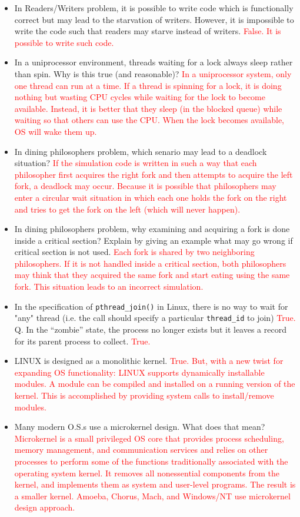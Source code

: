 \documentclass[10pt,landscape]{article}
\newcommand{\answer}[1]{\textcolor{red}{#1}}
\begin{document}
\begin{multicols}{4}
\begin{itemize}
    \item In Readers/Writers problem, it is possible to write code which is functionally correct but may lead to the starvation of writers. However, it is impossible to write the code such that readers may starve instead of writers. \answer{False. It is possible to write such code.}
    \item In a uniprocessor environment, threads waiting for a lock always sleep rather than spin. Why is this true (and reasonable)? \answer{In a uniprocessor system, only one thread can run at a time. If a thread is spinning for a lock, it is doing nothing but wasting CPU cycles while waiting for the lock to become available. Instead, it is better that they sleep (in the blocked queue) while waiting so that others can use the CPU.  When the lock becomes available, OS will wake them up.}
    \item In dining philosophers problem, which senario may lead to a deadlock situation?  \answer{If the simulation code is written in such a way that each philosopher first acquires the right fork and then attempts to acquire the left fork, a deadlock may occur. Because it is possible that philosophers may enter a circular wait situation in which each one holds the fork on the right and tries to get the fork on the left (which will never happen).}
    \item In dining philosophers problem, why examining and acquiring a fork is done inside a critical section? Explain by giving an example what may go wrong if critical section is not used.  \answer{Each fork is shared by two neighboring philosophers. If it is not handled inside a critical section, both philosophers may think that they acquired the same fork and start eating using the same fork. This situation leads to an incorrect simulation.}
    \item In the specification of \verb$pthread_join()$ in Linux, there is no way to wait for "any" thread (i.e. the call should specify a particular \verb$thread_id$ to join) \answer{True.}
    Q. In the ``zombie'' state, the process no longer exists but it leaves a record for its parent process to collect. \answer{True.}
    \item LINUX is designed as a monolithic kernel. \answer{True. But, with a new twist for expanding OS functionality: LINUX supports dynamically installable modules. A module can be compiled and installed on a running version of the kernel. This is accomplished by providing system calls to install/remove modules.}
    \item Many modern O.S.s use a microkernel design.  What does that mean? \answer{Microkernel is a small privileged OS core that provides process scheduling, memory management, and communication services and relies on other processes to perform some of the functions traditionally associated with the operating system kernel. It removes all nonessential components from the kernel, and implements them as system and user-level programs. The result is a smaller kernel. Amoeba, Chorus, Mach, and Windows/NT use microkernel design approach.}

\end{itemize}
\end{multicols}
\end{document}
